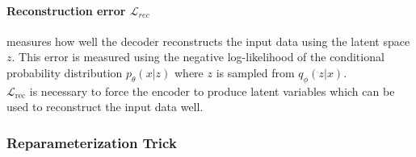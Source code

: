 

\vspace{2cm}

\paragraph{Reconstruction error $\mathcal{L}_{rec}$} measures how well the decoder reconstructs the input data using the latent space $z$.
This error is measured using the negative log-likelihood of the conditional probability distribution $p_\theta(x|z)$ where $z$ is sampled from $q_\phi(z | x)$.\\
$\mathcal{L}_{\mathrm{rec}}$ is necessary to force the encoder to produce latent variables which can be used to reconstruct the input data well.

\newpage

%





\subsubsection{Reparameterization Trick}

